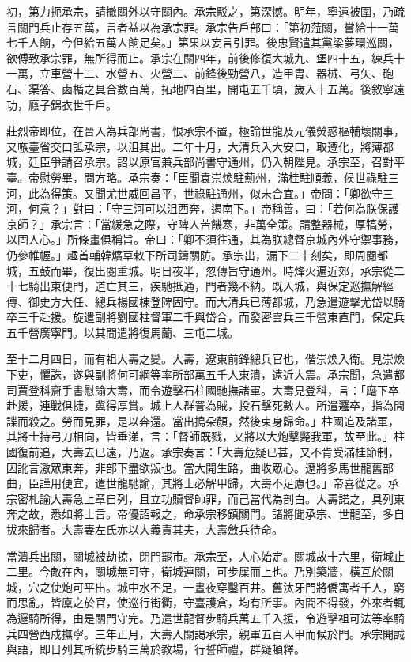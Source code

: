 \begin{pinyinscope}
初，第力扼承宗，請撤關外以守關內。承宗駁之，第深憾。明年，寧遠被圍，乃疏言關門兵止存五萬，言者益以為承宗罪。承宗告戶部曰：「第初蒞關，嘗給十一萬七千人餉，今但給五萬人餉足矣。」第果以妄言引罪。後忠賢遣其黨梁夢環巡關，欲傅致承宗罪，無所得而止。承宗在關四年，前後修復大城九、堡四十五，練兵十一萬，立車營十二、水營五、火營二、前鋒後勁營八，造甲胄、器械、弓矢、砲石、渠答、鹵楯之具合數百萬，拓地四百里，開屯五千頃，歲入十五萬。後敘寧遠功，廕子錦衣世千戶。

莊烈帝即位，在晉入為兵部尚書，恨承宗不置，極論世龍及元儀熒惑樞輔壞關事，又嗾臺省交口詆承宗，以沮其出。二年十月，大清兵入大安口，取遵化，將薄都城，廷臣爭請召承宗。詔以原官兼兵部尚書守通州，仍入朝陛見。承宗至，召對平臺。帝慰勞畢，問方略。承宗奏：「臣聞袁崇煥駐薊州，滿桂駐順義，侯世祿駐三河，此為得策。又聞尤世威回昌平，世祿駐通州，似未合宜。」帝問：「卿欲守三河，何意？」對曰：「守三河可以沮西奔，遏南下。」帝稱善，曰：「若何為朕保護京師？」承宗言：「當緩急之際，守陴人苦饑寒，非萬全策。請整器械，厚犒勞，以固人心。」所條畫俱稱旨。帝曰：「卿不須往通，其為朕總督京城內外守禦事務，仍參帷幄。」趣首輔韓爌草敕下所司鑄關防。承宗出，漏下二十刻矣，即周閱都城，五鼓而畢，復出閱重城。明日夜半，忽傳旨守通州。時烽火遍近郊，承宗從二十七騎出東便門，道亡其三，疾馳抵通，門者幾不納。既入城，與保定巡撫解經傳、御史方大任、總兵楊國棟登陴固守。而大清兵已薄都城，乃急遣遊擊尤岱以騎卒三千赴援。旋遣副將劉國柱督軍二千與岱合，而發密雲兵三千營東直門，保定兵五千營廣寧門。以其間遣將復馬蘭、三屯二城。

至十二月四日，而有祖大壽之變。大壽，遼東前鋒總兵官也，偕崇煥入衛。見崇煥下吏，懼誅，遂與副將何可綱等率所部萬五千人東潰，遠近大震。承宗聞，急遣都司賈登科齎手書慰諭大壽，而令遊擊石柱國馳撫諸軍。大壽見登科，言：「麾下卒赴援，連戰俱捷，冀得厚賞。城上人群詈為賊，投石擊死數人。所遣邏卒，指為間諜而殺之。勞而見罪，是以奔還。當出搗朵顏，然後束身歸命。」柱國追及諸軍，其將士持弓刀相向，皆垂涕，言：「督師既戮，又將以大炮擊斃我軍，故至此。」柱國復前追，大壽去已遠，乃返。承宗奏言：「大壽危疑已甚，又不肯受滿桂節制，因訛言激眾東奔，非部下盡欲叛也。當大開生路，曲收眾心。遼將多馬世龍舊部曲，臣謹用便宜，遣世龍馳諭，其將士必解甲歸，大壽不足慮也。」帝喜從之。承宗密札諭大壽急上章自列，且立功贖督師罪，而己當代為剖白。大壽諾之，具列東奔之故，悉如將士言。帝優詔報之，命承宗移鎮關門。諸將聞承宗、世龍至，多自拔來歸者。大壽妻左氏亦以大義責其夫，大壽斂兵待命。

當潰兵出關，關城被劫掠，閉門罷市。承宗至，人心始定。關城故十六里，衛城止二里。今敵在內，關城無可守，衛城連關，可步屟而上也。乃別築牆，橫互於關城，穴之使炮可平出。城中水不足，一晝夜穿鑿百井。舊汰牙門將僑寓者千人，窮而思亂，皆廩之於官，使巡行街衢，守臺護倉，均有所事。內間不得發，外來者輒為邏騎所得，由是關門守完。乃遣世龍督步騎兵萬五千入援，令遊擊祖可法等率騎兵四營西戍撫寧。三年正月，大壽入關謁承宗，親軍五百人甲而候於門。承宗開誠與語，即日列其所統步騎三萬於教場，行誓師禮，群疑頓釋。


\end{pinyinscope}
